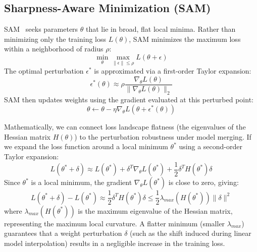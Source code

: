 \documentclass{article}
\begin{document}
\subsection{Sharpness-Aware Minimization (SAM)}
SAM~\cite{foret2021sharpness} seeks parameters $\theta$ that lie in broad, flat local minima. 
Rather than minimizing only the training loss $L(\theta)$, SAM minimizes the maximum loss within a neighborhood of radius $\rho$:
\begin{equation}
    \min_{\theta} \max_{\| \epsilon \| \le \rho} L(\theta + \epsilon)
\end{equation}
The optimal perturbation $\epsilon^*$ is approximated via a first-order Taylor expansion: 
\begin{equation}
    \epsilon^*(\theta) \approx \rho \frac{\nabla_\theta L(\theta)}{\|\nabla_\theta L(\theta)\|_2}
\end{equation}
SAM then updates weights using the gradient evaluated at this perturbed point:
\begin{equation}
    \theta \leftarrow \theta - \eta \nabla_\theta L(\theta + \epsilon^*(\theta))
\end{equation}

Mathematically, we can connect loss landscape flatness (the eigenvalues of the Hessian matrix $H(\theta)$) to the perturbation robustness under model merging. If we expand the loss function around a local minimum $\theta^*$ using a second-order Taylor expansion:
\begin{equation}
    L(\theta^* + \delta) \approx L(\theta^*) + \delta^T \nabla_\theta L(\theta^*) + \frac{1}{2} \delta^T H(\theta^*) \delta
\end{equation}
Since $\theta^*$ is a local minimum, the gradient $\nabla_\theta L(\theta^*)$ is close to zero, giving:
\begin{equation}
    L(\theta^* + \delta) - L(\theta^*) \approx \frac{1}{2} \delta^T H(\theta^*) \delta \le \frac{1}{2} \lambda_{max}(H(\theta^*)) \|\delta\|^2
\end{equation}
where $\lambda_{max}(H(\theta^*))$ is the maximum eigenvalue of the Hessian matrix, representing the maximum local curvature. A flatter minimum (smaller $\lambda_{max}$) guarantees that a weight perturbation $\delta$ (such as the shift induced during linear model interpolation) results in a negligible increase in the training loss.
\end{document}
